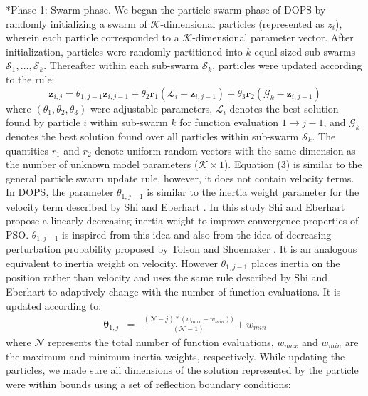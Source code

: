 \documentclass[12pt]{article}
\makeatletter
\renewcommand\subsubsection{\@startsection
	{subsubsection}{2}{0mm}
	{-0.05in}
	{-0.5\baselineskip}
	{\normalfont\normalsize\itshape}}
\makeatother
\begin{document}
\subsubsection*{Phase 1: Swarm phase.}
We began the particle swarm phase of DOPS by randomly initializing a swarm of $\mathcal{K}$-dimensional particles (represented as $z_{i}$),
wherein each particle corresponded to a $\mathcal{K}$-dimensional parameter vector.
After initialization, particles were randomly partitioned into $k$ equal sized sub-swarms $\mathcal{S}_{1},\hdots,\mathcal{S}_{k}$.
Thereafter within each sub-swarm $\mathcal{S}_{k}$, particles were updated according to the rule:
\begin{equation}\label{eqn:update-rule}
	\mathbf{z}_{i,j} = \theta_{1,j-1}\mathbf{z}_{i,j-1} + \theta_{2}\mathbf{r}_{1}\left(\mathcal{L}_{i} - \mathbf{z}_{i,j-1}\right) + \theta_{3}\mathbf{r}_{2}\left(\mathcal{G}_{k} - \mathbf{z}_{i,j-1}\right)
\end{equation}
where $\left(\theta_{1},\theta_{2},\theta_{3}\right)$ were adjustable parameters, $\mathcal{L}_{i}$ denotes the best solution found by particle $i$ within sub-swarm $k$ for function evaluation $1\rightarrow j-1$, and
$\mathcal{G}_{k}$ denotes the best solution found over all particles within sub-swarm $\mathcal{S}_{k}$.
The quantities $r_{1}$ and $r_{2}$ denote uniform random vectors with the same dimension as the number of unknown model parameters ($\mathcal{K}\times{1}$).
Equation (3) is similar to the general particle swarm update rule, however, it does not contain velocity terms.
In DOPS, the parameter $\theta_{1,j-1}$ is similar to the inertia weight parameter for the velocity term described by Shi and Eberhart \cite{shi1999empirical}. In this study Shi and Eberhart propose a linearly decreasing inertia weight to improve convergence properties of PSO. $\theta_{1,j-1}$ is inspired from this idea and also from the idea of decreasing perturbation probability proposed by Tolson and Shoemaker \cite{tolson2007dynamically}. It is an analogous equivalent to inertia weight on velocity. However $\theta_{1,j-1}$ places inertia on the position rather than velocity and uses the same rule described by Shi and Eberhart to adaptively change with the number of function evaluations. It is updated according to:
\begin{eqnarray}
	\mathbf \theta_{1,j}&=&\frac{(\mathcal{N}-{j})*({w}_{max}-{w}_{min}))}{(\mathcal{N}-{1})} + {w}_{min}
\end{eqnarray}
where $\mathcal{N}$ represents the total number of function evaluations, ${w}_{max}$ and ${w}_{min}$ are the maximum and minimum inertia weights, respectively.
While updating the particles, we made sure all dimensions of the solution represented by the particle were within bounds using a set of reflection boundary conditions:
\end{document}

